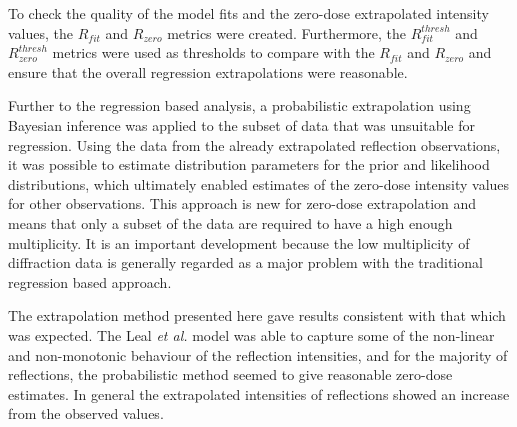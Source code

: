 To check the quality of the model fits and the zero-dose extrapolated intensity values, the $R_{fit}$ and $R_{zero}$ metrics were created.
Furthermore, the $R^{thresh}_{fit}$ and $R^{thresh}_{zero}$ metrics were used as thresholds to compare with the $R_{fit}$ and $R_{zero}$ and ensure that the overall regression extrapolations were reasonable.

Further to the regression based analysis, a probabilistic extrapolation using Bayesian inference was applied to the subset of data that was unsuitable for regression.
Using the data from the already extrapolated reflection observations, it was possible to estimate distribution parameters for the prior and likelihood distributions, which ultimately enabled estimates of the zero-dose intensity values for other observations.
This approach is new for zero-dose extrapolation and means that only a subset of the data are required to have a high enough multiplicity.
It is an important development because the low multiplicity of diffraction data is generally regarded as a major problem with the traditional regression based approach.

The extrapolation method presented here gave results consistent with that which was expected.
The Leal \textit{et al.} model was able to capture some of the non-linear and non-monotonic behaviour of the reflection intensities, and for the majority of reflections, the probabilistic method seemed to give reasonable zero-dose estimates.
In general the extrapolated intensities of reflections showed an increase from the observed values.


